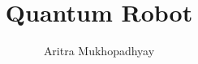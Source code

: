 \documentclass[12pt]{article}
\title{Quantum Robot}
\author{Aritra Mukhopadhyay}
\date{} %
\begin{document}
    

    

    \pagebreak
    \tableofcontents
    
    \pagebreak
    
    
    
    
    
    
    
    
    
    \pagebreak %
    \listoffigures
    
    
    \nocite{*}
\end{document}
